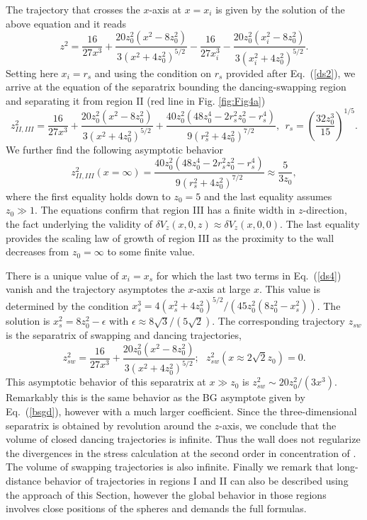 The trajectory that crosses the $x$-axis at $x=x_i$ is given by the solution of the above equation and it reads
\begin{equation}
z^2=
\frac{16}{27x^3}
+\frac{20z_0^2(x^2-8z_0^2)}{3(x^2+4z_0^2)^{5/2}}
-\frac{16}{27x_i^3}
-\frac{20z_0^2(x_i^2-8z_0^2)}{3(x_i^2+4z_0^2)^{5/2}}.
\label{ds4}
\end{equation}
Setting here $x_i=r_s$ and using the condition on $r_s$ provided after Eq.~(\ref{ds2}), we arrive at the equation of the separatrix bounding the dancing-swapping region and separating it from region II (red line in Fig. \ref{fig:Fig4a})
\begin{equation}
z_{II, III}^2=
\frac{16}{27 x^3}
+\frac{20z_0^2(x^2-8z_0^2)}{3(x^2+4z_0^2)^{5/2}}+\frac{40z_0^2\left(48z_0^4-2r_s^2 z_0^2-r_s^4\right)}{9(r_s^2+4z_0^2)^{7/2}},\ \ r_s= \left(\frac{32 z_0^3}{15}\right)^{1/5}.
\label{ds5}
\end{equation}
We further find the following asymptotic behavior
\begin{equation}
z_{II, III}^2(x=\infty) =\frac{40z_0^2\left(48z_0^4-2r_s^2 z_0^2-r_s^4\right)}{9(r_s^2+4z_0^2)^{7/2}}\approx \frac{5}{3z_0},
\end{equation}
where the first equality holds down to $z_0=5$ and the last equality assumes $z_0\gg 1$. The equations confirm that region III has a finite width in $z$-direction, the fact underlying the validity of $\delta V_z(x, 0, z)\approx \delta V_z(x, 0, 0)$. The last equality provides the scaling law of growth of region III as the proximity to the wall decreases from $z_0=\infty$ to some finite value.

There is a unique value of $x_i=x_s$ for which the last two terms in Eq.~(\ref{ds4}) vanish and the trajectory asymptotes the $x$-axis at large $x$. This value is determined by the condition  $x_s^3=4(x_s^2+4z_0^2)^{5/2}/(45 z_0^2(8z_0^2-x_s^2))$. The solution is $x_s^2=8z_0^2-\epsilon$ with $\epsilon\approx 8 \sqrt{3}/(5\sqrt{2})$. The corresponding trajectory $z_{sw}$ is the separatrix of swapping and dancing trajectories,
\begin{equation}
z_{sw}^2=
\frac{16}{27x^3}
+\frac{20z_0^2(x^2-8z_0^2)}{3(x^2+4z_0^2)^{5/2}};\ \ \ z_{sw}^2(x\approx 2\sqrt{2} z_0)=0.
\end{equation}
This asymptotic behavior of this separatrix at $x\gg z_0$ is $z_{sw}^2\sim 20z_0^2/(3x^3)$. Remarkably this is the same behavior as the BG asymptote given by Eq.~(\ref{bsgd}), however with a much larger coefficient. Since the three-dimensional separatrix is obtained by revolution around the $z$-axis, we conclude that the volume of closed dancing trajectories is infinite. Thus the wall does not regularize the divergences in the stress calculation at the second order in concentration of \cite{batchelor_green_1972b}. The volume of swapping trajectories is also infinite. Finally we remark that long-distance behavior of trajectories in regions I and II can also be described using the approach of this Section, however the global behavior in those regions involves close positions of the spheres and demands the full formulas.



